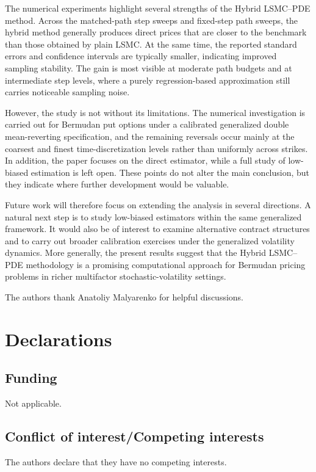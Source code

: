 \documentclass[pdflatex,sn-mathphys-num]{sn-jnl}
\theoremstyle{thmstyleone}%
\theoremstyle{thmstylethree}%
\theoremstyle{thmstyletwo}%
\begin{document}
The numerical experiments highlight several strengths of the Hybrid LSMC--PDE method. Across the matched-path step sweeps and fixed-step path sweeps, the hybrid method generally produces direct prices that are closer to the benchmark than those obtained by plain LSMC. At the same time, the reported standard errors and confidence intervals are typically smaller, indicating improved sampling stability. The gain is most visible at moderate path budgets and at intermediate step levels, where a purely regression-based approximation still carries noticeable sampling noise.

However, the study is not without its limitations. The numerical investigation is carried out for Bermudan put options under a calibrated generalized double mean-reverting specification, and the remaining reversals occur mainly at the coarsest and finest time-discretization levels rather than uniformly across strikes. In addition, the paper focuses on the direct estimator, while a full study of low-biased estimation is left open. These points do not alter the main conclusion, but they indicate where further development would be valuable.

Future work will therefore focus on extending the analysis in several directions. A natural next step is to study low-biased estimators within the same generalized framework. It would also be of interest to examine alternative contract structures and to carry out broader calibration exercises under the generalized volatility dynamics. More generally, the present results suggest that the Hybrid LSMC--PDE methodology is a promising computational approach for Bermudan pricing problems in richer multifactor stochastic-volatility settings.



\backmatter

The authors thank Anatoliy Malyarenko for helpful discussions.

\section*{Declarations}

\subsection*{Funding}
Not applicable.

\subsection*{Conflict of interest/Competing interests}
The authors declare that they have no competing interests.
\end{document}
